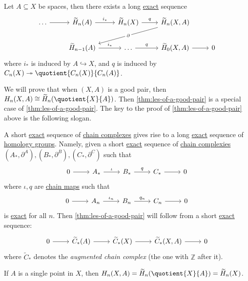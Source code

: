 \begin{theorem}\label{thm:long-exact-sequence-of-a-pair}
	Let $A \subseteq X$ be spaces, then there exists a long \hyperref[def:exact]{exact} sequence
	\[\begin{tikzcd}
			{\ldots} & {\widetilde{H}_n(A)} & {\widetilde{H}_n(X)} & {\widetilde{H}_n(X, A)} \\
			& {\widetilde{H}_{n-1}(A)} & \ldots & {\widetilde{H}_{0}(X, A)} & 0
			\arrow[from=1-1, to=1-2]
			\arrow["{i_\ast}", from=1-2, to=1-3]
			\arrow["q", from=1-3, to=1-4]
			\arrow[from=2-4, to=2-5]
			\arrow["{q}", from=2-3, to=2-4]
			\arrow["{i_\ast}", from=2-2, to=2-3]
			\arrow["{\partial}"{description}, from=1-4, to=2-2]
		\end{tikzcd}\]
	where \(i_\ast\) is induced by \(A\hookrightarrow X\), and \(q\) is induced by \(C_{n} (X)\twoheadrightarrow \quotient{C_{n} (X)}{C_{n} (A)}\).
\end{theorem}
We will prove that when $(X, A)$ is a good pair, then $H_n(X, A) \cong \widetilde{H}_n(\quotient{X}{A})$. Then \autoref{thm:les-of-a-good-pair}
is a special case of \autoref{thm:les-of-a-good-pair}. The key to the proof of \autoref{thm:les-of-a-good-pair} above is the following slogan.

\begin{remark}
	A short \hyperref[def:exact]{exact} sequence of \hyperref[def:chain-complex]{chain complexes} gives rise to a long \hyperref[def:exact]{exact} sequence
	of \hyperref[def:homology-group]{homology groups}. Namely, given a short \hyperref[def:exact]{exact} sequence of \hyperref[def:chain-complex]{chain complexies}
	\((A_\ast, \partial^A), (B_\ast, \partial^B), (C_\ast, \partial^C)\) such that
	\[\begin{tikzcd}
			0 & {A_\ast} & {B_\ast} & {C_\ast} & 0
			\arrow[from=1-1, to=1-2]
			\arrow["\iota", from=1-2, to=1-3]
			\arrow["q", from=1-3, to=1-4]
			\arrow[from=1-4, to=1-5]
		\end{tikzcd}\]
	where \(\iota , q\) are \hyperref[def:chain-map]{chain maps} such that
	\[\begin{tikzcd}
			0 & {A_n} & {B_n} & {C_n} & 0
			\arrow[from=1-1, to=1-2]
			\arrow["\iota_{n}", from=1-2, to=1-3]
			\arrow["q_{n}", from=1-3, to=1-4]
			\arrow[from=1-4, to=1-5]
		\end{tikzcd}\]
	is \hyperref[def:exact]{exact} for all \(n\).
	Then \autoref{thm:les-of-a-good-pair} will
	follow from a short \hyperref[def:exact]{exact} sequence:
	\[\begin{tikzcd}
			0 & {\widetilde{C}_\ast(A)} & {\widetilde{C}_\ast(X)} & {\widetilde{C}_\ast(X, A)} & 0
			\arrow[from=1-1, to=1-2]
			\arrow[from=1-2, to=1-3]
			\arrow[from=1-3, to=1-4]
			\arrow[from=1-4, to=1-5]
		\end{tikzcd}\]
	where $\widetilde{C}_\ast$ denotes the \emph{augmented chain complex} (the one with $\mathbb{Z}$ after it).
\end{remark}

\begin{exercise}
	If $A$ is a single point in $X$, then $H_n(X, A) = \widetilde{H}_n(\quotient{X}{A}) = \widetilde{H}_n(X)$.
\end{exercise}